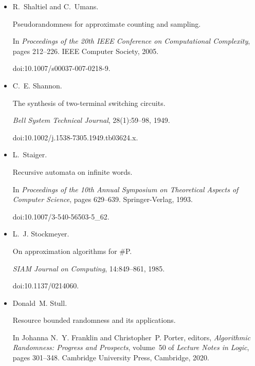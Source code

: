 \begin{itemize}
doi:10.1007/978-1-4612-4478-3\_9.





\item[] 
[70]

R. Shaltiel and C. Umans.


Pseudorandomness for approximate counting and sampling.


In \emph{Proceedings of the 20th IEEE Conference on Computational
Complexity}, pages 212–226. IEEE Computer Society, 2005.


doi:10.1007/s00037-007-0218-9.





\item[] 
[71]

C. E. Shannon.


The synthesis of two-terminal switching circuits.


\emph{Bell System Technical Journal}, 28(1):59–98, 1949.


doi:10.1002/j.1538-7305.1949.tb03624.x.





\item[] 
[72]

L. Staiger.


Recursive automata on infinite words.


In \emph{Proceedings of the 10th Annual Symposium on Theoretical
Aspects of Computer Science}, pages 629–639. Springer-Verlag, 1993.


doi:10.1007/3-540-56503-5\_62.





\item[] 
[73]

L. J. Stockmeyer.


On approximation algorithms for \#P.


\emph{SIAM Journal on Computing}, 14:849–861, 1985.


doi:10.1137/0214060.





\item[] 
[74]

Donald M. Stull.


Resource bounded randomness and its applications.


In Johanna N. Y. Franklin and Christopher P. Porter, editors, \emph{Algorithmic Randomness: Progress and Prospects}, volume 50 of \emph{Lecture
Notes in Logic}, pages 301–348. Cambridge University Press, Cambridge, 2020.



\end{itemize}
